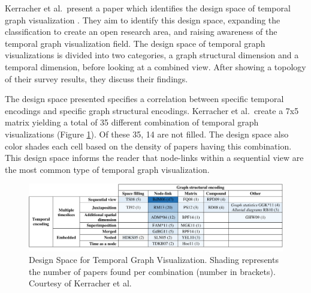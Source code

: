 Kerracher et al.\ present a paper which identifies the design space of temporal graph visualization \cite{kerracher2014design}. They aim to identify this design space, expanding the classification to create an open research area, and raising awareness of the temporal graph visualization field.
The design space of temporal graph visualizations is divided into two categories, a graph structural dimension and a temporal dimension, before looking at a combined view. After showing a topology of their survey results, they discuss their findings.

The design space presented specifies a correlation between specific temporal encodings and specific graph structural encodings. Kerracher et al.\ create a 7x5 matrix yielding a total of 35 different combination of temporal graph visualizations (Figure \ref{fig: kerracher2014design}). Of these 35, 14 are not filled. The design space also color shades  each cell based on the density of papers having this combination. This design space informs the reader that node-links within a sequential view are the most common type of temporal graph visualization.

\begin{figure}[t]
\begin{center}
\includegraphics[width=1\textwidth]{images/kerracher2014designFull}
\caption{Design Space for Temporal Graph Visualization. Shading represents the number of papers found per combination (number in brackets). Courtesy of Kerracher et al.\ \cite{kerracher2014design}} \label{fig: kerracher2014design}
\end{center}
\end{figure}

